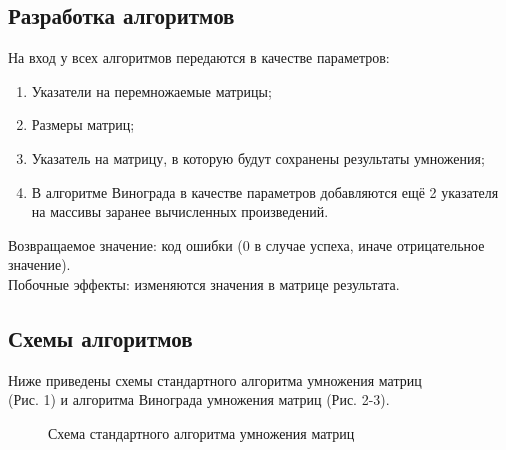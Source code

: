 \documentclass[a4paper,12pt]{article}
\begin{document}
\subsection{Разработка алгоритмов}
На вход у всех алгоритмов передаются в качестве параметров:
\begin{enumerate}
\item Указатели на перемножаемые матрицы;
\item Размеры матриц;
\item Указатель на матрицу, в которую будут сохранены результаты умножения;
\item В алгоритме Винограда в качестве параметров добавляются ещё 2 указателя на массивы заранее вычисленных произведений.
\end{enumerate}
Возвращаемое значение: код ошибки (0 в случае успеха, иначе отрицательное значение). \\
Побочные эффекты: изменяются значения в матрице результата.

\newpage
\subsection{Схемы алгоритмов}
Ниже приведены схемы стандартного алгоритма умножения матриц\\(Рис. 1) и алгоритма Винограда умножения матриц (Рис. 2-3).
\begin{figure}[h!]
\caption{Схема стандартного алгоритма умножения матриц}
\label{images:multiply_standard}
\end{figure}
\end{document}
